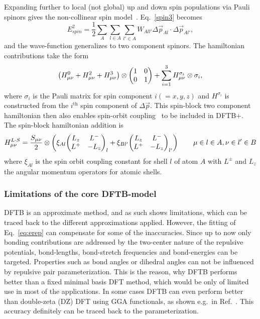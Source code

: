 \documentclass[reprint,onecolumn,superscriptaddress]{revtex4-1}
\newcommand{\dftbp}{DFTB+}
\begin{document}
Expanding further to local (not global) up and down spin populations via Pauli
spinors gives the non-collinear spin model~\cite{doi:10.1021/jp068802p}.
Eq.~\eqref{spin3} becomes
\begin{equation}
E^2_{spin} = \frac{1}{2}\sum_{A}\sum_{l \in A} \sum_{l' \in A} W_{All'} \Delta \vec{p}_{Al} \cdot \Delta \vec{p}_{Al'},\label{spin3nc}
\end{equation}
and the wave-function generalizes to two component spinors. The hamiltonian
contributions take the form
\begin{equation}
\left(H^0_{\mu\nu} + H^2_{\mu\nu} + H^3_{\mu\nu}\right) \otimes \mqty(\pmat{0}) + \sum_{i=1}^{3} H^{\sigma_i}_{\mu\nu} \otimes \sigma_i, 
\end{equation}
where $\sigma_i$ is the Pauli matrix for spin component $i (= x,y,z)$ and
$H^{\sigma_i}$ is constructed from the $i^\mathrm{th}$ spin component of $\Delta
\vec{p}$. This spin-block two component hamiltonian then also enables spin-orbit
coupling~\cite{doi:10.1021/jp068802p,Hourahine11} to be included in \dftbp{}. The
spin-block hamiltonian addition is
\begin{equation}
H_{\mu\nu}^{L \cdot S} = \frac{S_{\mu\nu}}{2} \otimes\left(  \xi_{Al} \mqty( L_z & L^-\\ L^+ & - L_z )_l + \xi_{Bl'} \mqty( L_z & L^-\\ L^+ & - L_z )_{l'} \right)\qquad{\mu \in l\in A, \nu \in l' \in B}
\end{equation}
where $\xi_{Al}$ is the spin orbit coupling constant for shell $l$ of atom $A$
with $L^\pm$ and $L_z$ the angular momentum operators for atomic shells.

\subsubsection{Limitations of the core DFTB-model}

DFTB is an approximate method, and as such shows limitations, which can be
traced back to the different approximations applied.  However, the fitting of
Eq.~\eqref{eq:erep} can compensate for some of the inaccuracies.  Since up to
now only bonding contributions are addressed by the two-center nature of the
repulsive potentials, bond-lengths, bond-stretch frequencies and bond-energies
can be targeted. Properties such as bond angles or dihedral angles can not be
influenced by repulsive pair parameterization.  This is the reason, why DFTB
performs better than a fixed minimal basis DFT method, which would be only of
limited use in most of the applications. In some cases DFTB can even perform
better than double-zeta (DZ) DFT using GGA functionals, as shown e.g.\ in
Ref.~\cite{Gaus2012}. This accuracy definitely can be traced back to the
parameterization.
\end{document}
